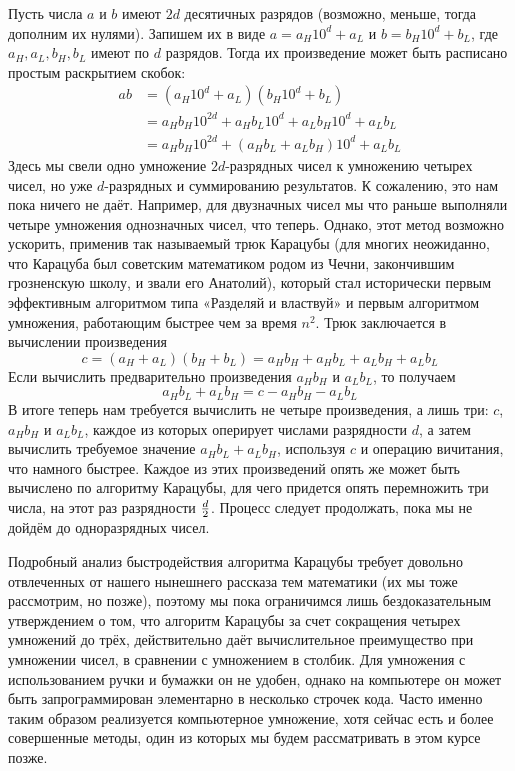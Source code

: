 Пусть числа $a$ и $b$ имеют $2d$ десятичных разрядов (возможно, меньше, тогда дополним их нулями). Запишем их в виде $a = a_H10^d + a_L$ и $b = b_H10^d + b_L$, где $a_H, a_L, b_H, b_L$ имеют по $d$ разрядов. Тогда их произведение может быть расписано простым раскрытием скобок:
\begin{align*}
ab &= (a_H10^d + a_L)(b_H10^d + b_L) \\
         &= a_Hb_H10^{2d} + a_Hb_L10^d + a_Lb_H10^d + a_Lb_L\\
         &= a_Hb_H10^{2d} + (a_Hb_L + a_Lb_H)10^d + a_Lb_L
\end{align*}
Здесь мы свели одно умножение $2d$-разрядных чисел к умножению четырех чисел, но уже $d$-разрядных и суммированию результатов. К сожалению, это нам пока ничего не даёт. Например, для двузначных чисел мы что раньше выполняли четыре умножения однозначных чисел, что теперь. Однако, этот метод возможно ускорить, применив так называемый трюк Карацубы (для многих неожиданно, что Карацуба был советским математиком родом из Чечни, закончившим грозненскую школу, и звали его Анатолий), который стал исторически первым эффективным алгоритмом типа «Разделяй и властвуй» и первым алгоритмом умножения, работающим быстрее чем за время $n^2$. Трюк заключается в вычислении произведения
$$c = (a_H + a_L)(b_H + b_L) = a_Hb_H + a_Hb_L + a_Lb_H + a_Lb_L$$
Если вычислить предварительно произведения $a_Hb_H$ и $a_Lb_L$, то получаем
$$a_Hb_L + a_Lb_H = c - a_Hb_H - a_Lb_L$$
В итоге теперь нам требуется вычислить не четыре произведения, а лишь три: $c$, $a_Hb_H$ и $a_Lb_L$, каждое из которых оперирует числами разрядности $d$, а затем вычислить требуемое значение $a_Hb_L + a_Lb_H$, используя $c$ и операцию вичитания, что намного быстрее. Каждое из этих произведений опять же может быть вычислено по алгоритму Карацубы, для чего придется опять перемножить три числа, на этот раз разрядности $d \over 2$. Процесс следует продолжать, пока мы не дойдём до одноразрядных чисел.

Подробный анализ быстродействия алгоритма Карацубы требует довольно отвлеченных от нашего нынешнего рассказа тем математики (их мы тоже рассмотрим, но позже), поэтому мы пока ограничимся лишь бездоказательным утверждением о том, что алгоритм Карацубы за счет сокращения четырех умножений до трёх, действительно даёт вычислительное преимущество при умножении чисел, в сравнении с умножением в столбик. Для умножения с использованием ручки и бумажки он не удобен, однако на компьютере он может быть запрограммирован элементарно в несколько строчек кода. Часто именно таким образом реализуется компьютерное умножение, хотя сейчас есть и более совершенные методы, один из которых мы будем рассматривать в этом курсе позже.

